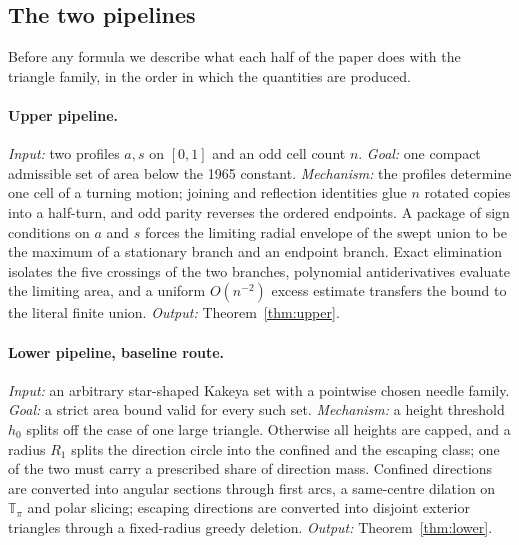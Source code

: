 \documentclass[11pt]{article}
\theoremstyle{plain}
\theoremstyle{definition}
\theoremstyle{remark}
\newcommand{\Tp}{\mathbb{T}_{\pi}}
\begin{document}
\subsection{The two pipelines}\label{sec:pipelines}

Before any formula we describe what each half of the paper does with the
triangle family, in the order in which the quantities are produced.

\paragraph{Upper pipeline.}
\emph{Input:} two profiles $a,s$ on $[0,1]$ and an odd cell count $n$.
\emph{Goal:} one compact admissible set of area below the 1965 constant.
\emph{Mechanism:} the profiles determine one cell of a turning motion; joining
and reflection identities glue $n$ rotated copies into a half-turn, and odd
parity reverses the ordered endpoints. A package of sign conditions on $a$ and
$s$ forces the limiting radial envelope of the swept union to be the maximum of
a stationary branch and an endpoint branch. Exact elimination isolates the five
crossings of the two branches, polynomial antiderivatives evaluate the limiting
area, and a uniform $O(n^{-2})$ excess estimate transfers the bound to the
literal finite union. \emph{Output:} Theorem~\ref{thm:upper}.

\paragraph{Lower pipeline, baseline route.}
\emph{Input:} an arbitrary star-shaped Kakeya set with a pointwise chosen needle
family. \emph{Goal:} a strict area bound valid for every such set.
\emph{Mechanism:} a height threshold $h_{0}$ splits off the case of one large
triangle. Otherwise all heights are capped, and a radius $R_{1}$ splits the
direction circle into the confined and the escaping class; one of the two must
carry a prescribed share of direction mass. Confined directions are converted
into angular sections through first arcs, a same-centre dilation on $\Tp$ and
polar slicing; escaping directions are converted into disjoint exterior
triangles through a fixed-radius greedy deletion. \emph{Output:}
Theorem~\ref{thm:lower}.
\end{document}
